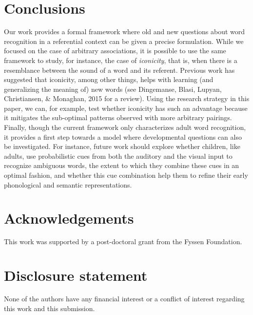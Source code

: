 \documentclass[english,floatsintext,man]{apa6}
\theoremstyle{definition}
\theoremstyle{definition}
\theoremstyle{definition}
\theoremstyle{remark}
\begin{document}
\section{Conclusions}\label{conclusions}

Our work provides a formal framework where old and new questions about
word recognition in a referential context can be given a precise
formulation. While we focused on the case of arbitrary associations, it
is possible to use the same framework to study, for instance, the case
of \textit{iconicity}, that is, when there is a resemblance between the
sound of a word and its referent. Previous work has suggested that
iconicity, among other things, helps with learning (and generalizing the
meaning of) new words (see Dingemanse, Blasi, Lupyan, Christiansen, \&
Monaghan, 2015 for a review). Using the research strategy in this paper,
we can, for example, test whether iconicity has such an advantage
because it mitigates the sub-optimal patterns observed with more
arbitrary pairings. Finally, though the current framework only
characterizes adult word recognition, it provides a first step towards a
model where developmental questions can also be investigated. For
instance, future work should explore whether children, like adults, use
probabilistic cues from both the auditory and the visual input to
recognize ambiguous words, the extent to which they combine these cues
in an optimal fashion, and whether this cue combination help them to
refine their early phonological and semantic representations.

\vspace{1em}

\vspace{1em}

\section{Acknowledgements}\label{acknowledgements}

This work was supported by a post-doctoral grant from the Fyssen
Foundation.

\section{Disclosure statement}\label{disclosure-statement}

None of the authors have any financial interest or a conflict of
interest regarding this work and this submission.
\end{document}
